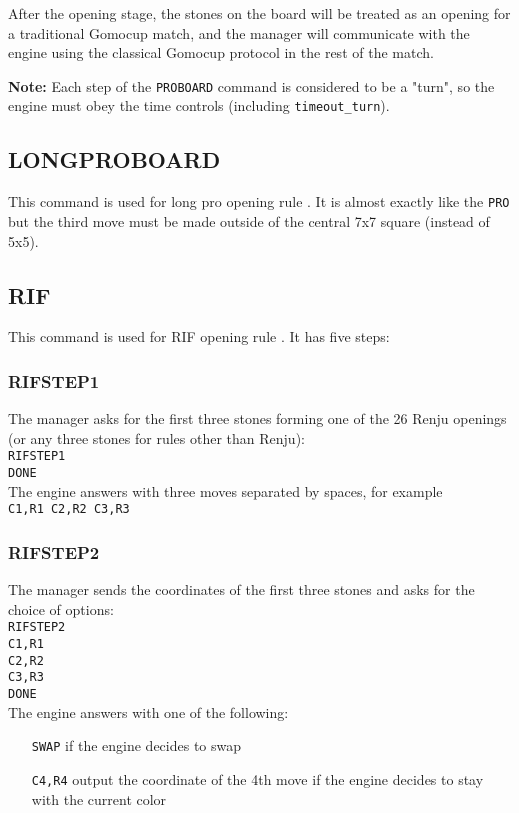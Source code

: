 \documentclass[12pt,a4paper]{article}
\begin{document}
After the opening stage, the stones on the board will be treated as an opening for a traditional Gomocup match, and the manager will communicate with the engine using the classical Gomocup protocol in the rest of the match.

\textbf{Note:} Each step of the \texttt{PROBOARD} command is considered to be a "turn", so the engine must obey the time controls (including \texttt{timeout{\_}turn}).


\subsection{LONGPROBOARD}
\label{cmd_longpro}
This command is used for long pro opening rule \cite{gomoku_opening_rules}. It is almost exactly like the \texttt{PRO} but the third move must be made outside of the central 7x7 square (instead of 5x5).


\subsection{RIF}
\label{cmd_rif}
This command is used for RIF opening rule \cite{renju_opening_rules}. It has five steps:

\subsubsection{RIFSTEP1}
The manager asks for the first three stones forming one of the 26 Renju openings (or any three stones for rules other than Renju):\\
\texttt{RIFSTEP1}\\
\texttt{DONE}\\
The engine answers with three moves separated by spaces, for example\\
\texttt{C1,R1 C2,R2 C3,R3}

\subsubsection{RIFSTEP2}
The manager sends the coordinates of the first three stones and asks for the choice of options:\\
\texttt{RIFSTEP2}\\
\texttt{C1,R1}\\
\texttt{C2,R2}\\
\texttt{C3,R3}\\
\texttt{DONE}\\
The engine answers with one of the following:
\begin{enumerate}[leftmargin=7.5em]
\item[\texttt{SWAP}]{if the engine decides to swap}
\item[\texttt{C4,R4}]{output the coordinate of the 4th move if the engine decides to stay with the current color}
\end{enumerate}
\end{document}
